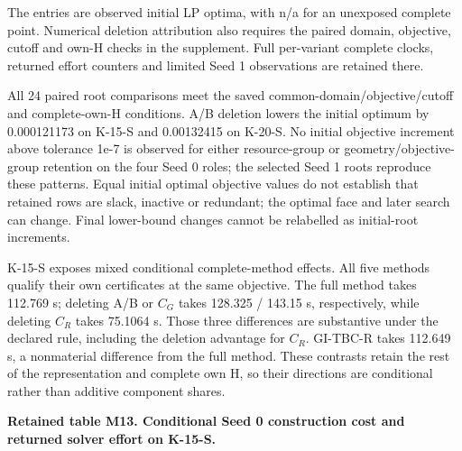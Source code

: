 \documentclass[
  american,
  11pt,
]{article}
\begin{document}
The entries are observed initial LP optima, with n/a for an unexposed
complete point. Numerical deletion attribution also requires the paired
domain, objective, cutoff and own-H checks in the supplement. Full
per-variant complete clocks, returned effort counters and limited Seed 1
observations are retained there.

All 24 paired root comparisons meet the saved
common-domain/objective/cutoff and complete-own-H conditions. A/B
deletion lowers the initial optimum by 0.000121173 on K-15-S and
0.00132415 on K-20-S. No initial objective increment above tolerance
1e-7 is observed for either resource-group or geometry/objective-group
retention on the four Seed 0 roles; the selected Seed 1 roots reproduce
these patterns. Equal initial optimal objective values do not establish
that retained rows are slack, inactive or redundant; the optimal face
and later search can change. Final lower-bound changes cannot be
relabelled as initial-root increments.

K-15-S exposes mixed conditional complete-method effects. All five
methods qualify their own certificates at the same objective. The full
method takes 112.769 s; deleting A/B or \(C_G\) takes 128.325 / 143.15
s, respectively, while deleting \(C_R\) takes 75.1064 s. Those three
differences are substantive under the declared rule, including the
deletion advantage for \(C_R\). GI-TBC-R takes 112.649 s, a nonmaterial
difference from the full method. These contrasts retain the rest of the
representation and complete own H, so their directions are conditional
rather than additive component shares.

\Needspace{204pt}

\textbf{Retained table M13. Conditional Seed 0 construction cost and
returned solver effort on K-15-S.}
\end{document}
